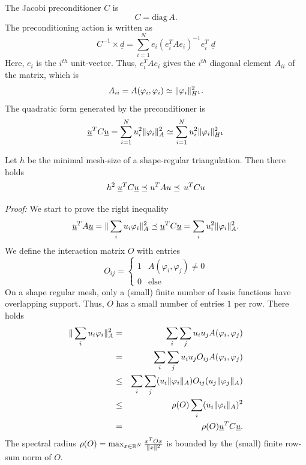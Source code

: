 The Jacobi preconditioner $C$ is
$$
C = \mbox{diag} \, A.
$$
The preconditioning action is written as
$$
C^{-1} \times \underline d = 
\sum_{i=1}^N e_i (e_i^T A e_i)^{-1} e_i^T \; \underline d
$$
Here, $e_i$ is the $i^{th}$ unit-vector. Thus, $e_i^T A e_i$ gives the
$i^{th}$ diagonal element $A_{ii}$ of the matrix, which is
$$
A_{ii} = A(\varphi_i, \varphi_i) \simeq \| \varphi_i \|_{H^1}^2.
$$
%
The quadratic form generated by the preconditioner is
$$
\underline {u} ^T C \underline u = \sum_{i=1}^N u_i^2 \| \varphi_i \|_A^2
 \simeq \sum_{i=1}^N u_i^2 \| \varphi_i \|_{H^1}^2
$$

\begin{theorem} \label{theo_jacobi} 
Let $h$ be the minimal mesh-size of a shape-regular
triangulation. Then there holds
\begin{equation}\label{equ_jacobi}
h^2 \; \underline u^T C \underline u \preceq u^T A u \preceq \, u^T C u
\end{equation}
\end{theorem}
{\em Proof:} We start to prove the right inequality
$$
\underline u^T A \underline u = \| \sum_{i} u_i \varphi_i \|_A^2 \preceq 
\underline u^T C \underline u = \sum_i u_i^2 \| \varphi_i \|_A^2.
$$
We define the interaction matrix $O$ with entries
$$
O_{ij} = \left\{ \begin{array} {cl}
        1 & A(\varphi_i, \varphi_j) \neq 0 \\
        0 & \mbox{else} 
        \end{array} \right.
$$
On a shape regular mesh, only a (small) finite number of basis functions have
overlapping support. Thus, $O$ has a small number of entries $1$ per row.
There holds
\begin{eqnarray*}
\| \sum_i u_i \varphi_i \|_A^2 & = &
        \sum_i \sum_j u_i u_j A(\varphi_i, \varphi_j) \\
        & = & \sum_i \sum_j u_i u_j O_{ij} A(\varphi_i, \varphi_j)  \\
        & \leq & \sum_i \sum_j (u_i \| \varphi_i \|_A)  O_{ij} (u_j  \| \varphi_j \|_A) \\
        & \leq & \rho (O) \sum_i   ( u_i \|\varphi_i \|_A)^2 \\
        & = & \rho(O) \underline u^T C \underline u.
\end{eqnarray*}
The spectral radius $\rho(O) = \max_{x \in {\mathbb R}^N} \frac{x^T O x}{\|x\|^2}$ 
is bounded by the (small) finite row-sum norm of $O$.

